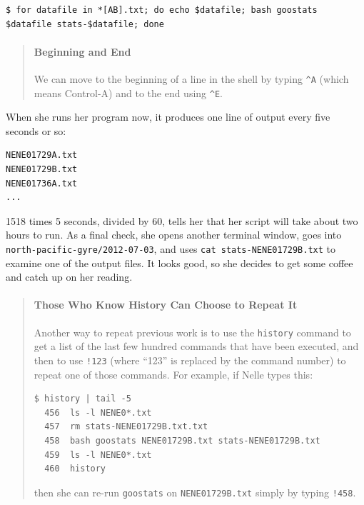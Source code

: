 \documentclass[]{book}
\begin{document}
\begin{verbatim}
$ for datafile in *[AB].txt; do echo $datafile; bash goostats $datafile stats-$datafile; done
\end{verbatim}

\begin{quote}
\mbox{}\paragraph{Beginning and End}

We can move to the beginning of a line in the shell by typing
\texttt{\^{}A} (which means Control-A) and to the end using
\texttt{\^{}E}.
\end{quote}

When she runs her program now, it produces one line of output every five
seconds or so:

\begin{verbatim}
NENE01729A.txt
NENE01729B.txt
NENE01736A.txt
...
\end{verbatim}

1518 times 5 seconds, divided by 60, tells her that her script will take
about two hours to run. As a final check, she opens another terminal
window, goes into \texttt{north-pacific-gyre/2012-07-03}, and uses
\texttt{cat stats-NENE01729B.txt} to examine one of the output files. It
looks good, so she decides to get some coffee and catch up on her
reading.

\begin{quote}
\mbox{}\paragraph{Those Who Know History Can Choose to Repeat It}

Another way to repeat previous work is to use the \texttt{history}
command to get a list of the last few hundred commands that have been
executed, and then to use \texttt{!123} (where ``123'' is replaced by
the command number) to repeat one of those commands. For example, if
Nelle types this:

\begin{verbatim}
$ history | tail -5
  456  ls -l NENE0*.txt
  457  rm stats-NENE01729B.txt.txt
  458  bash goostats NENE01729B.txt stats-NENE01729B.txt
  459  ls -l NENE0*.txt
  460  history
\end{verbatim}

then she can re-run \texttt{goostats} on \texttt{NENE01729B.txt} simply
by typing \texttt{!458}.
\end{quote}
\end{document}
